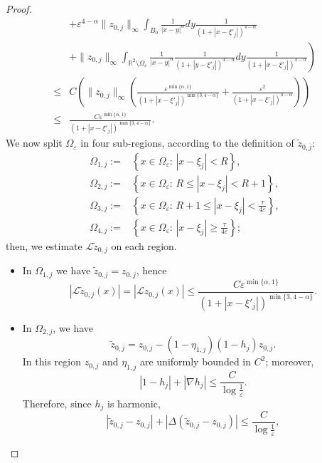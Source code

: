 \documentclass[11pt]{article}
\begin{document}
\begin{proof}
\begin{align}
\nonumber&\left.+\varepsilon^{4-\alpha}\|z_{0,j}\|_\infty\int_{B_0}\frac1{|x-y|^\alpha}dy\frac1{\left(1+\left|x-\xi'_j\right|\right)^{4-\alpha}}\right.\\
\nonumber&\left.+\|z_{0,j}\|_\infty\int_{\mathbb R^2\setminus\Omega_\varepsilon}\frac1{|x-y|^\alpha}\frac1{\left(1+\left|y-\xi'_j\right|\right)^{4-\alpha}}dy\frac1{\left(1+\left|x-\xi'_j\right|\right)^{4-\alpha}}\right)\\
\nonumber\le&C\left(\|z_{0,j}\|_\infty\left(\frac{\varepsilon^{\min\{\alpha,1\}}}{\left(1+\left|x-\xi'_j\right|\right)^{\min\{3,4-\alpha\}}}+\frac{\varepsilon^2}{\left(1+\left|x-\xi'_j\right|\right)^{4-\alpha}}\right)\right)\\
\label{lz0j}\le&\frac{C\varepsilon^{\min\{\alpha,1\}}}{\left(1+\left|x-\xi'_j\right|\right)^{\min\{3,4-\alpha\}}}.
\end{align}
We now split $\Omega_\varepsilon$ in four sub-regions, according to the definition of $\widetilde z_{0,j}$:
\begin{align}
\label{omegai,j}\Omega_{1,j}:=&\left\{x\in\Omega_\varepsilon:\,\left|x-\xi_j\right|<R\right\},\\
\nonumber\Omega_{2,j}:=&\left\{x\in\Omega_\varepsilon:\,R\le\left|x-\xi_j\right|<R+1\right\},\\
\nonumber\Omega_{3,j}:=&\left\{x\in\Omega_\varepsilon:\,R+1\le\left|x-\xi_j\right|<\frac\tau{4\varepsilon}\right\},\\
\nonumber\Omega_{4,j}:=&\left\{x\in\Omega_\varepsilon:\,\left|x-\xi_j\right|\ge\frac\tau{4\varepsilon}\right\};
\end{align}
then, we estimate $\mathcal L\widetilde z_{0,j}$ on each region.\\
\begin{itemize}
\item In $\Omega_{1,j}$ we have $\widetilde z_{0,j}=z_{0,j}$, hence
\begin{equation}\label{eq. inve2 4}|\mathcal L\widetilde z_{0,j}(x)|=|\mathcal Lz_{0,j}(x)|\le\frac{C\varepsilon^{\min\{\alpha,1\}}}{\left(1+\left|x-\xi'_j\right|\right)^{\min\{3,4-\alpha\}}}.
\end{equation}
\item In $\Omega_{2,j}$, we have
$$\widetilde z_{0,j}=z_{0,j}-(1-\eta_{1,j})(1-h_j)z_{0,j}.$$
In this region $z_{0,j}$ and $\eta_{1,j}$ are uniformly bounded in $C^2$; moreover,
$$|1-h_j|+|\nabla h_j|\le\frac C{\log\frac1\varepsilon}.$$
Therefore, since $h_j$ is harmonic,
\begin{equation}\label{diffz0j}
|\widetilde z_{0,j}-z_{0,j}|+|\Delta(\widetilde z_{0,j}-z_{0,j})|\le\frac C{\log\frac1\varepsilon},

\end{equation}
\end{itemize}
\end{proof}
\end{document}
